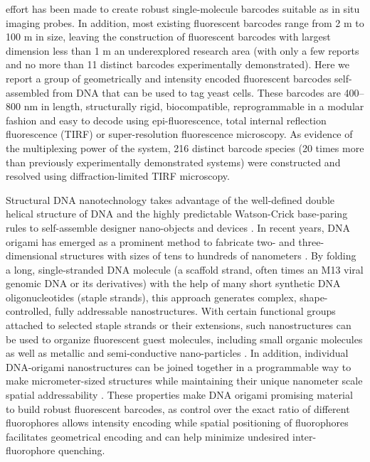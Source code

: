 effort has been made to create robust single-molecule barcodes suitable as in situ imaging 
probes. In addition, most existing fluorescent barcodes range from 2 \textmu m to 100 \textmu m in 
size, leaving the construction of fluorescent barcodes with largest dimension less than 1 
\textmu m an underexplored research area (with only a few reports  \citep{li_multiplexed_2005,lin_self-assembled_2007,li_controlled_2010,levsky_single-cell_2002} and no more than 11 
distinct barcodes experimentally demonstrated). Here we report a group of geometrically and intensity 
encoded fluorescent barcodes self-assembled from DNA that can be used to tag yeast 
cells. These barcodes are 400–800 nm in length, structurally rigid, biocompatible, 
reprogrammable in a modular fashion and easy to decode using epi-fluorescence, total internal reflection fluorescence (TIRF) or 
super-resolution fluorescence microscopy. As evidence of the multiplexing power of the 
system, 216 distinct barcode species (20 times more than previously experimentally 
demonstrated systems) were constructed and resolved using diffraction-limited TIRF 
microscopy. 

Structural DNA nanotechnology takes advantage of the well-defined double 
helical structure of DNA and the highly predictable Watson-Crick base-paring rules to 
self-assemble designer nano-objects and devices \citep{seeman_nucleic_1982,aldaye_assembling_2008,lin_designer_2009,nangreave_dna_2010,shih_knitting_2010,trring_dna_2011}. In recent years, DNA origami has 
emerged as a prominent method to fabricate two- and three-dimensional structures with 
sizes of tens to hundreds of nanometers \citep{rothemund_folding_2006,douglas_self-assembly_2009,dietz_folding_2009,ke_multilayer_2009,andersen_self-assembly_2009,han_folding_2010,liedl_self-assembly_2010,han_dna_2011}. By folding a long, single-stranded DNA 
molecule (a scaffold strand, often times an M13 viral genomic DNA or its derivatives) 
with the help of many short synthetic DNA oligonucleotides (staple strands), this 
approach generates complex, shape-controlled, fully addressable nanostructures. With 
certain functional groups attached to selected staple strands or their extensions, such 
nanostructures can be used to organize fluorescent guest molecules, including small 
organic molecules \citep{jungmann_single-molecule_2010,steinhauer_dna_2009,lund_molecular_2010} as well as metallic \citep{pal_dna-origami-directed_2010} and semi-conductive nano-particles \citep{bui_programmable_2010}. In 
addition, individual DNA-origami nanostructures can be joined together in a 
programmable way to make micrometer-sized structures while maintaining their unique 
nanometer scale spatial addressability \citep{liu_crystalline_2011,woo_programmable_2011}. These properties make DNA origami 
promising material to build robust fluorescent barcodes, as control over the exact ratio of 
different fluorophores allows intensity encoding while spatial positioning of fluorophores 
facilitates geometrical encoding and can help minimize undesired inter-fluorophore 
quenching. 

